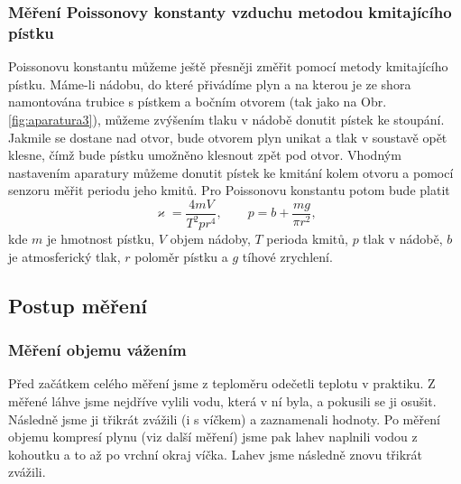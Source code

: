\documentclass[english]{article}
\begin{document}
			\subsubsection{Měření Poissonovy konstanty vzduchu metodou kmitajícího pístku}
					Poissonovu konstantu můžeme ještě přesněji změřit pomocí metody kmitajícího pístku. Máme-li nádobu, do které přivádíme plyn a na kterou je ze shora namontována trubice s pístkem a bočním otvorem (tak jako na Obr. \ref{fig:aparatura3}), můžeme zvýšením tlaku v nádobě donutit pístek ke stoupání. Jakmile se dostane nad otvor, bude otvorem plyn unikat a tlak v soustavě opět klesne, čímž bude pístku umožněno klesnout zpět pod otvor. Vhodným nastavením aparatury můžeme donutit pístek ke kmitání kolem otvoru a pomocí senzoru měřit periodu jeho kmitů. Pro Poissonovu konstantu potom bude platit
					\begin{equation}\label{eq:pistek}
							\varkappa = \frac{4mV}{T^2pr^4}, \qquad p=b+\frac{mg}{\pi r^2},
					\end{equation}
					kde $m$ je hmotnost pístku, $V$ objem nádoby, $T$ perioda kmitů, $p$ tlak v nádobě, $b$ je atmosferický tlak, $r$ poloměr pístku a $g$ tíhové zrychlení.
					
	\subsection{Postup měření}
			\subsubsection{Měření objemu vážením}
				   Před začátkem celého měření jsme z teploměru odečetli teplotu v praktiku. Z měřené láhve jsme nejdříve vylili vodu, která v ní byla, a pokusili se ji osušit. Následně jsme ji třikrát zvážili (i s víčkem) a zaznamenali hodnoty. Po měření objemu kompresí plynu (viz další měření) jsme pak lahev naplnili vodou z kohoutku a to až po vrchní okraj víčka. Lahev jsme následně znovu třikrát zvážili. 
					
\end{document}
